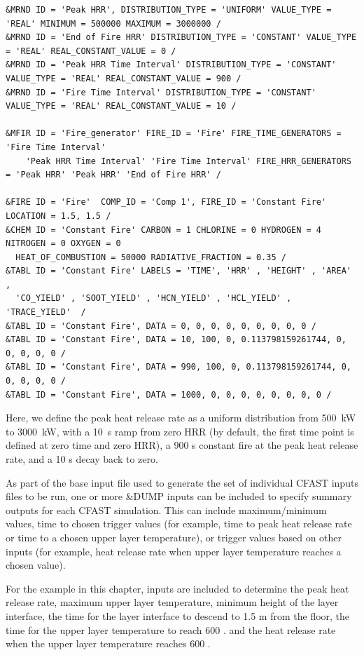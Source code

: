 \documentclass[12pt,twoside]{book}
\begin{document}
\begin{lstlisting}[basicstyle=\scriptsize]
&MRND ID = 'Peak HRR', DISTRIBUTION_TYPE = 'UNIFORM' VALUE_TYPE = 'REAL' MINIMUM = 500000 MAXIMUM = 3000000 /
&MRND ID = 'End of Fire HRR' DISTRIBUTION_TYPE = 'CONSTANT' VALUE_TYPE = 'REAL' REAL_CONSTANT_VALUE = 0 /
&MRND ID = 'Peak HRR Time Interval' DISTRIBUTION_TYPE = 'CONSTANT' VALUE_TYPE = 'REAL' REAL_CONSTANT_VALUE = 900 /
&MRND ID = 'Fire Time Interval' DISTRIBUTION_TYPE = 'CONSTANT' VALUE_TYPE = 'REAL' REAL_CONSTANT_VALUE = 10 /

&MFIR ID = 'Fire_generator' FIRE_ID = 'Fire' FIRE_TIME_GENERATORS = 'Fire Time Interval'
    'Peak HRR Time Interval' 'Fire Time Interval' FIRE_HRR_GENERATORS = 'Peak HRR' 'Peak HRR' 'End of Fire HRR' /

&FIRE ID = 'Fire'  COMP_ID = 'Comp 1', FIRE_ID = 'Constant Fire'  LOCATION = 1.5, 1.5 /
&CHEM ID = 'Constant Fire' CARBON = 1 CHLORINE = 0 HYDROGEN = 4 NITROGEN = 0 OXYGEN = 0
  HEAT_OF_COMBUSTION = 50000 RADIATIVE_FRACTION = 0.35 /
&TABL ID = 'Constant Fire' LABELS = 'TIME', 'HRR' , 'HEIGHT' , 'AREA' ,
  'CO_YIELD' , 'SOOT_YIELD' , 'HCN_YIELD' , 'HCL_YIELD' , 'TRACE_YIELD'  /
&TABL ID = 'Constant Fire', DATA = 0, 0, 0, 0, 0, 0, 0, 0, 0 /
&TABL ID = 'Constant Fire', DATA = 10, 100, 0, 0.113798159261744, 0, 0, 0, 0, 0 /
&TABL ID = 'Constant Fire', DATA = 990, 100, 0, 0.113798159261744, 0, 0, 0, 0, 0 /
&TABL ID = 'Constant Fire', DATA = 1000, 0, 0, 0, 0, 0, 0, 0, 0 /
\end{lstlisting}

Here, we define the peak heat release rate as a uniform distribution from 500~kW to 3000~kW, with a 10~s ramp from zero HRR (by default, the first time point is defined at zero time and zero HRR), a 900 s constant fire at the peak heat release rate, and a 10 s decay back to zero.

As part of the base input file used to generate the set of individual CFAST inputs files to be run, one or more {\ct \&DUMP} inputs can be included to specify summary outputs for each CFAST simulation. This can include maximum/minimum values, time to chosen trigger values (for example, time to peak heat release rate or time to a chosen upper layer temperature), or trigger values based on other inputs (for example, heat release rate when upper layer temperature reaches a chosen value).

For the example in this chapter, inputs are included to determine the peak heat release rate, maximum upper layer temperature, minimum height of the layer interface, the time for the layer interface to descend to 1.5 m from the floor, the time for the upper layer temperature to reach 600 \degc. and the heat release rate when the upper layer temperature reaches 600 \degc.
\end{document}
